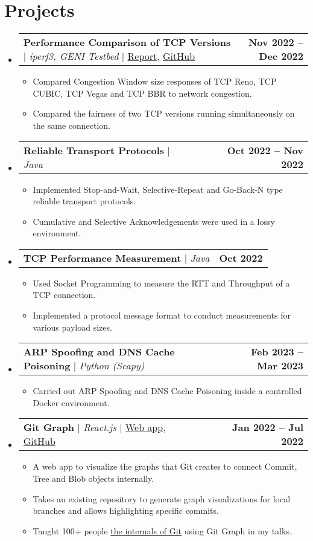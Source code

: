 \documentclass[letterpaper,11pt]{article}
\makeatletter
\newcommand{\resumeItem}[1]{
  \item\small{
    {#1 \vspace{-2pt}}
  }
}
\newcommand{\resumeProjectHeading}[2]{
    \item
    \begin{tabular*}{1.001\textwidth}{l@{\extracolsep{\fill}}r}
      \small#1 & \textbf{\small #2}\\
    \end{tabular*}\vspace{-7pt}
}
\newcommand{\resumeSubHeadingListStart}{\begin{itemize}[leftmargin=0.0in, label={}]}
\newcommand{\resumeSubHeadingListEnd}{\end{itemize}}
\newcommand{\resumeItemListStart}{\begin{itemize}}
\newcommand{\resumeItemListEnd}{\end{itemize}\vspace{-5pt}}
\makeatother
\begin{document}
\section{Projects}
    \vspace{-6pt}
    \resumeSubHeadingListStart
        \resumeProjectHeading
            {\textbf{\normalsize{Performance Comparison of TCP Versions}} $|$ \emph{iperf3, GENI Testbed} $|$ \href{https://harshkapadia2.github.io/tcp-version-performance-comparison}{Report}, \href{https://github.com/HarshKapadia2/tcp-version-performance-comparison}{GitHub}}{Nov 2022 -- Dec 2022}
            \resumeItemListStart
                \resumeItem{Compared Congestion Window size responses of TCP Reno, TCP CUBIC, TCP Vegas and TCP BBR to network congestion.}
                \resumeItem{Compared the fairness of two TCP versions running simultaneously on the same connection.}
            \resumeItemListEnd
        \vspace{-15pt}

        \resumeProjectHeading
            {\textbf{\normalsize{Reliable Transport Protocols}} $|$ \emph{Java}}{Oct 2022 -- Nov 2022}
            \resumeItemListStart
                \resumeItem{Implemented Stop-and-Wait, Selective-Repeat and Go-Back-N type reliable transport protocols.}
                \resumeItem{Cumulative and Selective Acknowledgements were used in a lossy environment.}
            \resumeItemListEnd
        \vspace{-15pt}

        \resumeProjectHeading
            {\textbf{\normalsize{TCP Performance Measurement}} $|$ \emph{Java}}{Oct 2022}
            \resumeItemListStart
                \resumeItem{Used Socket Programming to measure the RTT and Throughput of a TCP connection.}
                \resumeItem{Implemented a protocol message format to conduct measurements for various payload sizes.}
            \resumeItemListEnd
        \vspace{-15pt}

        \resumeProjectHeading
            {\textbf{\normalsize{ARP Spoofing and DNS Cache Poisoning}} $|$ \emph{Python (Scapy)}}{Feb 2023 -- Mar 2023}
            \resumeItemListStart
                \resumeItem{Carried out ARP Spoofing and DNS Cache Poisoning inside a controlled Docker environment.}
            \resumeItemListEnd
        \vspace{-15pt}

        \resumeProjectHeading
            {\textbf{\normalsize{Git Graph}} $|$ \emph{React.js} $|$ \href{https://git-graph.harshkapadia.me}{Web app}, \href{https://github.com/HarshKapadia2/git-graph}{GitHub}}{Jan 2022 -- Jul 2022}
            \resumeItemListStart
                \resumeItem{A web app to visualize the graphs that Git creates to connect Commit, Tree and Blob objects internally.}
                \resumeItem{Takes an existing repository to generate graph visualizations for local branches and allows highlighting specific commits.}
                \resumeItem{Taught 100+ people \href{https://talks.harshkapadia.me/git_internals}{the internals of Git} using Git Graph in my talks.}
            \resumeItemListEnd
    \resumeSubHeadingListEnd
\vspace{-15pt}
\end{document}
